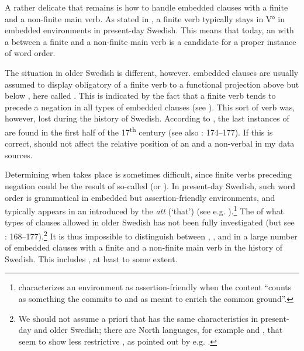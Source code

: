 \documentclass[output=paper, colorlinks, citecolor=brown]{langscibook}
\begin{document}
A rather delicate  that remains is how to handle embedded clauses with a finite  and a non-finite main verb. As stated in , a finite verb typically stays in V° in embedded environments in present-day Swedish. This means that today, an  with a  between a finite  and a non-finite main verb is a candidate for a proper instance of  word order.


The situation in older Swedish is different, however.  embedded clauses are usually assumed to display obligatory  of a finite verb to a functional projection above  but below , here called . This is indicated by the fact that a finite verb tends to precede a negation in all types of embedded clauses (see \citealt{Platzack1988emergence,Falk1993,Hakansson2013}). This sort of verb  was, however, lost during the history of Swedish. According to \citet{Platzack1988emergence}, the last instances of   are found in the first half of the 17\textsuperscript{th} century (see also \citealt{Falk1993}: 174–177). If this is correct,  should not affect the relative position of an  and a non-verbal  in my data sources.



Determining when  takes place is sometimes difficult, since finite verbs preceding negation could be the result of so-called  (or ). In present-day Swedish, such  word order is grammatical in embedded but assertion-friendly environments, and typically appears in an  introduced by the  \textit{att} (‘that’) (see e.g. \citealt{Petersson2014}).\footnote{\citet[4]{Gartner2016} characterizes an environment as assertion-friendly when the content “counts as something the  commits to and as meant to enrich the common ground”.} The  of what types of clauses allowed  in older Swedish has not been fully investigated (but see \citealt{Falk1993}: 168–177).\footnote{We should not assume a priori that  has the same characteristics in present-day and older Swedish; there are North  languages, for example  and , that seem to show less restrictive , as pointed out by e.g. \citet{Gartner2016}.} It is thus impossible to distinguish between , , and  in a large number of embedded clauses with a finite  and a non-finite main verb in the history of Swedish. This includes , at least to some extent.
\end{document}
